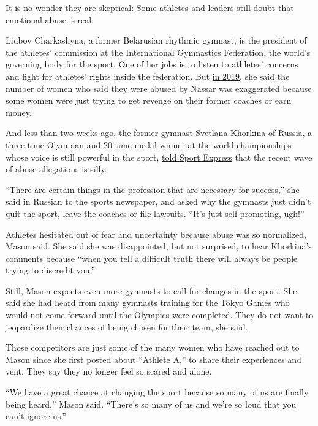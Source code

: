It is no wonder they are skeptical: Some athletes and leaders still
doubt that emotional abuse is real.

Liubov Charkashyna, a former Belarusian rhythmic gymnast, is the
president of the athletes' commission at the International Gymnastics
Federation, the world's governing body for the sport. One of her jobs is
to listen to athletes' concerns and fight for athletes' rights inside
the federation. But
\href{http://eng.gymnovosti.com/charkashyna-on-sexual-abuse-in-sports-its-america-they-know-how-to-make-money/}{in
2019}, she said the number of women who said they were abused by Nassar
was exaggerated because some women were just trying to get revenge on
their former coaches or earn money.

And less than two weeks ago, the former gymnast Svetlana Khorkina of
Russia, a three-time Olympian and 20-time medal winner at the world
championships whose voice is still powerful in the sport,
\href{https://www.sport-express.ru/artistic-gymnastics/reviews/chto-dumaet-olimpiyskaya-chempionka-svetlana-horkina-o-harrasmente-v-sportivnoy-gimnastike-1694484/}{told
Sport Express} that the recent wave of abuse allegations is silly.

``There are certain things in the profession that are necessary for
success,'' she said in Russian to the sports newspaper, and asked why
the gymnasts just didn't quit the sport, leave the coaches or file
lawsuits. ``It's just self-promoting, ugh!''

Athletes hesitated out of fear and uncertainty because abuse was so
normalized, Mason said. She said she was disappointed, but not
surprised, to hear Khorkina's comments because ``when you tell a
difficult truth there will always be people trying to discredit you.''

Still, Mason expects even more gymnasts to call for changes in the
sport. She said she had heard from many gymnasts training for the Tokyo
Games who would not come forward until the Olympics were completed. They
do not want to jeopardize their chances of being chosen for their team,
she said.

Those competitors are just some of the many women who have reached out
to Mason since she first posted about ``Athlete A,'' to share their
experiences and vent. They say they no longer feel so scared and alone.

``We have a great chance at changing the sport because so many of us are
finally being heard,'' Mason said. ``There's so many of us and we're so
loud that you can't ignore us.''

